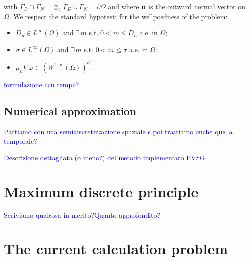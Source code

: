 with $\Gamma_D\cap\Gamma_N=\varnothing$, $\Gamma_D\cup\Gamma_N=\partial \Omega$ and where $\mathbf{n}$ is the outward normal vector on $\Omega$.
We respect the standard hypotesti for the wellposdness of the problem:
\begin{itemize}
\item $D_n \in L^{\infty}(\Omega)$ and $\exists \, m$ s.t. $0<m\leq D_n$ a.e. in $\Omega$;
\item $\sigma \in L^{\infty}(\Omega)$ and $\exists \, m$ s.t. $0<m\leq \sigma$ a.e. in $\Omega$;
\item $\mu_n \nabla \varphi \in (W^{1,\infty}(\Omega))^d$.
\end{itemize}

\textcolor{blue}{formulazione con tempo?}


\subsection{Numerical approximation}

\textcolor{blue}{Partiamo con una semidiscretizzazione spaziale e poi trattiamo anche quella temporale?}

\textcolor{blue}{Descrizione dettagliata (o meno?) del metodo implementato FVSG}

\section{Maximum discrete principle}
\textcolor{blue}{Scriviamo qualcosa in merito?Quanto approfondito?}


\section{The current calculation problem}

